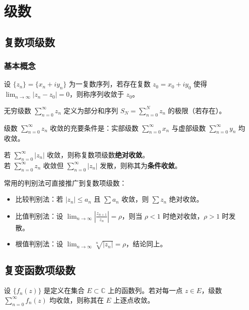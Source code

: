 \chapter{级数}

\section{复数项级数}

\subsection{基本概念}
设 $\{z_n\} = \{x_n + i y_n\}$ 为一复数序列，若存在复数 $z_0 = x_0 + i y_0$ 使得 $\lim_{n\to\infty} |z_n - z_0| = 0$，则称序列收敛于 $z_0$。

无穷级数 $\sum_{n=0}^{\infty} z_n$ 定义为部分和序列 $S_N = \sum_{n=0}^{N} z_n$ 的极限（若存在）。

\begin{tcolorbox}[title=定理：收敛的充要条件, colframe=green!45!black, colback=green!5!white]
	级数 $\sum_{n=0}^{\infty} z_n$ 收敛的充要条件是：实部级数 $\sum_{n=0}^{\infty} x_n$ 与虚部级数 $\sum_{n=0}^{\infty} y_n$ 均收敛。
\end{tcolorbox}

\begin{tcolorbox}[title=定义：绝对收敛与条件收敛, colframe=blue!50!black, colback=blue!5!white, sharp corners]
	若 $\sum_{n=0}^{\infty} |z_n|$ 收敛，则称复数项级数\textbf{绝对收敛}。\\
	若 $\sum_{n=0}^{\infty} z_n$ 收敛但 $\sum_{n=0}^{\infty} |z_n|$ 发散，则称其为\textbf{条件收敛}。
\end{tcolorbox}

常用的判别法可直接推广到复数项级数：
\begin{itemize}
	\item 比较判别法：若 $|z_n| \le a_n$ 且 $\sum a_n$ 收敛，则 $\sum z_n$ 绝对收敛。
	\item 比值判别法：设 $\lim_{n\to\infty} \left| \frac{z_{n+1}}{z_n} \right| = \rho$，则当 $\rho<1$ 时绝对收敛，$\rho>1$ 时发散。
	\item 根值判别法：设 $\lim_{n\to\infty} \sqrt[n]{|z_n|} = \rho$，结论同上。
\end{itemize}

\section{复变函数项级数}
设 $\{f_n(z)\}$ 是定义在集合 $E\subset\mathbb{C}$ 上的函数列。若对每一点 $z\in E$，级数 $\sum_{n=0}^{\infty} f_n(z)$ 均收敛，则称其在 $E$ 上逐点收敛。

